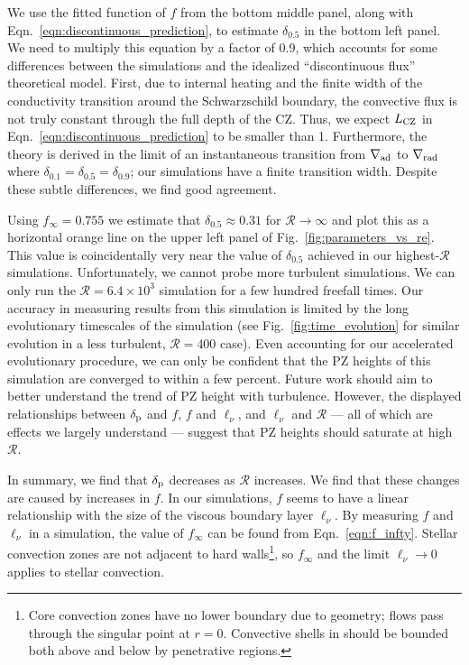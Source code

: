 \documentclass[twocolumn, linenumbers]{aastex631}
\newcommand{\gradrad}{\ensuremath{\nabla_{\rm{rad}}}}
\newcommand{\gradad}{\ensuremath{\nabla_{\rm{ad}}}}
\newcommand{\delp}{\ensuremath{\delta_{\rm{p}}}}
\newcommand{\mR}{\ensuremath{\mathcal{R}}}
\begin{document}
We use the fitted function of $f$ from the bottom middle panel, along with Eqn.~\ref{eqn:discontinuous_prediction}, to estimate $\delta_{0.5}$ in the bottom left panel.
We need to multiply this equation by a factor of 0.9, which accounts for some differences between the simulations and the idealized ``discontinuous flux'' theoretical model.
First, due to internal heating and the finite width of the conductivity transition around the Schwarzschild boundary, the convective flux is not truly constant through the full depth of the CZ.
Thus, we expect $L_{\rm{CZ}}$  in Eqn.~\ref{eqn:discontinuous_prediction} to be smaller than 1.
Furthermore, the theory is derived in the limit of an instantaneous transition from $\gradad$ to $\gradrad$ where $\delta_{0.1} = \delta_{0.5} = \delta_{0.9}$; our simulations have a finite transition width.
Despite these subtle differences, we find good agreement.

Using $f_\infty = 0.755$ we estimate that $\delta_{0.5} \approx 0.31$ for $\mR \rightarrow \infty$ and plot this as a horizontal orange line on the upper left panel of Fig.~\ref{fig:parameters_vs_re}.
This value is coincidentally very near the value of $\delta_{0.5}$ achieved in our highest-$\mR$ simulations.
Unfortunately, we cannot probe more turbulent simulations.
We can only run the $\mR = 6.4 \times 10^{3}$ simulation for a few hundred freefall times.
Our accuracy in measuring results from this simulation is limited by the long evolutionary timescales of the simulation (see Fig.~\ref{fig:time_evolution} for similar evolution in a less turbulent, $\mR = 400$ case).
Even accounting for our accelerated evolutionary procedure, we can only be confident that the PZ heights of this simulation are converged to within a few percent.
Future work should aim to better understand the trend of PZ height with turbulence.
However, the displayed relationships between $\delp$ and $f$, $f$ and $\ell_\nu$, and $\ell_\nu$ and $\mR$ --- all of which are effects we largely understand --- suggest that PZ heights should saturate at high $\mR$.

In summary, we find that $\delp$ decreases as $\mR$ increases.
We find that these changes are caused by increases in $f$.
In our simulations, $f$ seems to have a linear relationship with the size of the viscous boundary layer $\ell_\nu$.
By measuring $f$ and $\ell_\nu$ in a simulation, the value of $f_\infty$ can be found from Eqn.~\ref{eqn:f_infty}.
Stellar convection zones are not adjacent to hard walls\footnote{
Core convection zones have no lower boundary due to geometry; flows pass through the singular point at $r = 0$.
Convective shells in should be bounded both above and below by penetrative regions.
}, so $f_\infty$ and the limit $\ell_\nu \rightarrow 0$ applies to stellar convection.
\end{document}
